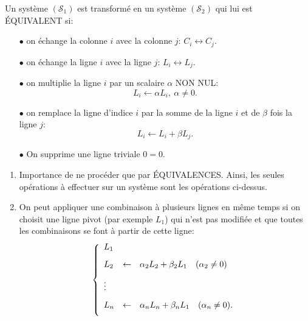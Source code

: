 \documentclass[a4paper, 11pt]{article}
\begin{document}
{\noindent  

\begin{prop} 
Un syst\`eme $(\mathcal{S}_1)$ est transform\'e en un syst\`eme $(\mathcal{S}_2)$ qui lui est \'EQUIVALENT si:
\begin{itemize}
 \item[$\bullet$]
on \'echange la colonne $i$ avec la colonne $j$: $C_i\leftrightarrow C_j$.
\item[$\bullet$]  
on \'echange la ligne $i$ avec la ligne $j$: $L_i\leftrightarrow L_j.$\\
\vsec

\vsec
\item[$\bullet$] 
on multiplie la ligne $i$ par un scalaire $\alpha$ NON NUL:
$$L_i\leftarrow \alpha L_i,\ \alpha\not= 0.$$
\item[$\bullet$]  
on remplace la ligne d'indice $i$ par la somme de la ligne $i$ et de $\beta$ fois la ligne $j$:
$$ L_i\leftarrow L_i+\beta L_j.$$

\item[$\bullet$]   On supprime une ligne triviale $0=0$. 
\quad

\vspace{0.01cm}

%

\end{itemize}
\end{prop}

}


\begin{rem}
\begin{enumerate}
 \item Importance de ne proc\'eder que par \'EQUIVALENCES. Ainsi, les seules op\'erations \`a effectuer sur un syst\`eme sont les op\'erations ci-dessus.
\item 
On peut appliquer une combinaison \`a plusieurs lignes en m\^eme temps si on choisit une ligne pivot (par exemple $L_1$) qui n'est pas modifi\'ee et que toutes les combinaisons se font \`a partir de cette ligne:
$$\left\lbrace\begin{array}{lll}
L_1 &  &\vsec\\
L_2 &\leftarrow & \alpha_2 L_2+\beta_2 L_1 \quad (\alpha_2 \not=0)\vsec\\
\vdots  &&\vsec\\
L_n &\leftarrow &\alpha_n L_n+\beta_n L_1 \quad (\alpha_n \not=0).\vsec\\ 
\end{array}\right.
$$
\end{enumerate}
\end{rem}
\end{document}
